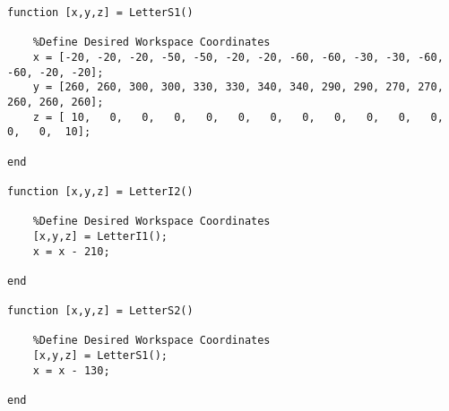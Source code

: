 \begin{lstlisting}[frame=lines,style=Matlab-editor,basicstyle = \mlttfamily, caption=MEIOSIS Name Plotting]
function [x,y,z] = LetterS1()

    %Define Desired Workspace Coordinates
    x = [-20, -20, -20, -50, -50, -20, -20, -60, -60, -30, -30, -60, -60, -20, -20];
    y = [260, 260, 300, 300, 330, 330, 340, 340, 290, 290, 270, 270, 260, 260, 260];
    z = [ 10,   0,   0,   0,   0,   0,   0,   0,   0,   0,   0,   0,   0,   0,  10];

end

function [x,y,z] = LetterI2()

    %Define Desired Workspace Coordinates
    [x,y,z] = LetterI1();
    x = x - 210;

end

function [x,y,z] = LetterS2()

    %Define Desired Workspace Coordinates
    [x,y,z] = LetterS1();
    x = x - 130;

end


\end{lstlisting}
